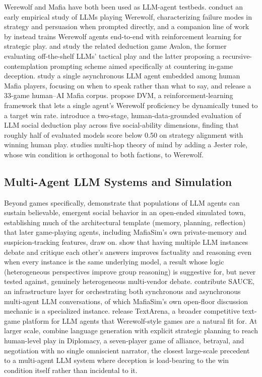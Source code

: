 \documentclass{article}
\begin{document}
Werewolf and Mafia have both been used as LLM-agent testbeds. \citet{xu2023exploring} conduct an early empirical study of LLMs playing Werewolf, characterizing failure modes in strategy and persuasion when prompted directly, and a companion line of work by \citet{xu2024language} instead trains Werewolf agents end-to-end with reinforcement learning for strategic play. \citet{light2023text} and \citet{wang2023avalon} study the related deduction game Avalon, the former evaluating off-the-shelf LLMs' tactical play and the latter proposing a recursive-contemplation prompting scheme aimed specifically at countering in-game deception. \citet{eckhaus2025time} study a single asynchronous LLM agent embedded among human Mafia players, focusing on when to speak rather than what to say, and release a 33-game human--AI Mafia corpus. \citet{zhang2025dvm} propose DVM, a reinforcement-learning framework that lets a single agent's Werewolf proficiency be dynamically tuned to a target win rate. \citet{song2025beyond} introduce a two-stage, human-data-grounded evaluation of LLM social deduction play across five social-ability dimensions, finding that roughly half of evaluated models score below 0.50 on strategy alignment with winning human play. \citet{mittal2026triadic} studies multi-hop theory of mind by adding a Jester role, whose win condition is orthogonal to both factions, to Werewolf.

\subsection{Multi-Agent LLM Systems and Simulation}

Beyond games specifically, \citet{park2023generative} demonstrate that populations of LLM agents can sustain believable, emergent social behavior in an open-ended simulated town, establishing much of the architectural template (memory, planning, reflection) that later game-playing agents, including MafiaSim's own private-memory and suspicion-tracking features, draw on. \citet{du2023debate} show that having multiple LLM instances debate and critique each other's answers improves factuality and reasoning even when every instance is the same underlying model, a result whose logic (heterogeneous perspectives improve group reasoning) is suggestive for, but never tested against, genuinely heterogeneous multi-vendor debate. \citet{neuberger2024sauce} contribute SAUCE, an infrastructure layer for orchestrating both synchronous and asynchronous multi-agent LLM conversations, of which MafiaSim's own open-floor discussion mechanic is a specialized instance. \citet{guertler2025textarena} release TextArena, a broader competitive text-game platform for LLM agents that Werewolf-style games are a natural fit for. At larger scale, \citet{bakhtin2022human} combine language generation with explicit strategic planning to reach human-level play in Diplomacy, a seven-player game of alliance, betrayal, and negotiation with no single omniscient narrator, the closest large-scale precedent to a multi-agent LLM system where deception is load-bearing to the win condition itself rather than incidental to it.
\end{document}

